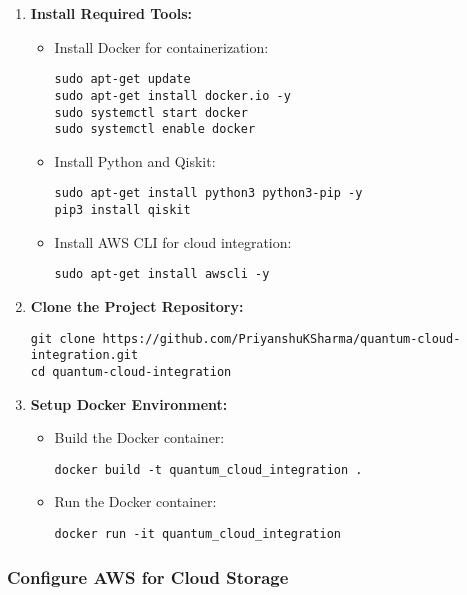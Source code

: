 \documentclass[12pt,a4paper]{article}
\begin{document}
\begin{enumerate}
    \item \textbf{Install Required Tools:}
    \begin{itemize}
        \item Install Docker for containerization:
        \begin{verbatim}
sudo apt-get update
sudo apt-get install docker.io -y
sudo systemctl start docker
sudo systemctl enable docker
        \end{verbatim}
        \item Install Python and Qiskit:
        \begin{verbatim}
sudo apt-get install python3 python3-pip -y
pip3 install qiskit
        \end{verbatim}
        \item Install AWS CLI for cloud integration:
        \begin{verbatim}
sudo apt-get install awscli -y
        \end{verbatim}
    \end{itemize}

    \item \textbf{Clone the Project Repository:}
    \begin{verbatim}
git clone https://github.com/PriyanshuKSharma/quantum-cloud-integration.git
cd quantum-cloud-integration
    \end{verbatim}

    \item \textbf{Setup Docker Environment:}
    \begin{itemize}
        \item Build the Docker container:
        \begin{verbatim}
docker build -t quantum_cloud_integration .
        \end{verbatim}
        \item Run the Docker container:
        \begin{verbatim}
docker run -it quantum_cloud_integration
        \end{verbatim}
    \end{itemize}
\end{enumerate}

\subsubsection{Configure AWS for Cloud Storage}
\end{document}
